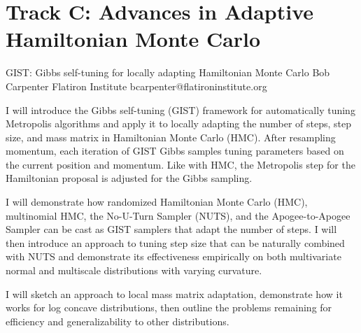 \section{Track C: Advances in Adaptive Hamiltonian Monte Carlo}\newpage

\begin{talk}
  {GIST: Gibbs self-tuning for locally adapting Hamiltonian Monte Carlo}%
  {Bob Carpenter}%
  {Flatiron Institute}%
  {bcarpenter@flatironinstitute.org}%
  {}%
  
    
   
I will introduce the Gibbs self-tuning (GIST) framework for automatically tuning Metropolis algorithms and apply it to locally adapting the number of steps, step size, and mass matrix in Hamiltonian Monte Carlo (HMC).  After resampling momentum, each iteration of GIST Gibbs samples tuning parameters based on the current position and momentum.  Like with HMC, the Metropolis step for the Hamiltonian proposal is adjusted for the Gibbs sampling.

I will demonstrate how randomized Hamiltonian Monte Carlo (HMC), multinomial HMC, the No-U-Turn Sampler (NUTS), and the Apogee-to-Apogee Sampler can be cast as GIST samplers that adapt the number of steps.  I will then introduce an approach to tuning step size that can be naturally combined with NUTS and demonstrate its effectiveness empirically on both multivariate normal and multiscale distributions with varying curvature.  

I will sketch an approach to local mass matrix adaptation, demonstrate how it works for log concave distributions, then outline the problems remaining for efficiency and generalizability to other distributions.

\end{talk}

